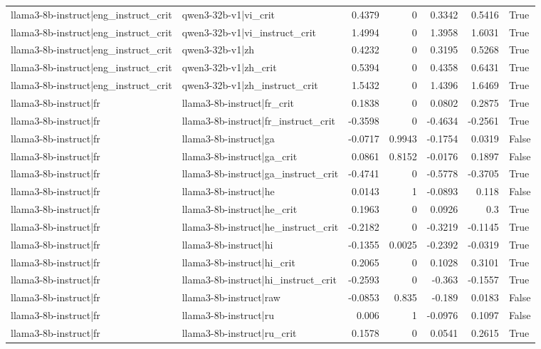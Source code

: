 \begin{table}
\begin{tabular}{l l r r r r l}
llama3-8b-instruct|eng_instruct_crit & qwen3-32b-v1|vi_crit & 0.4379 & 0 & 0.3342 & 0.5416 & True \\
llama3-8b-instruct|eng_instruct_crit & qwen3-32b-v1|vi_instruct_crit & 1.4994 & 0 & 1.3958 & 1.6031 & True \\
llama3-8b-instruct|eng_instruct_crit & qwen3-32b-v1|zh & 0.4232 & 0 & 0.3195 & 0.5268 & True \\
llama3-8b-instruct|eng_instruct_crit & qwen3-32b-v1|zh_crit & 0.5394 & 0 & 0.4358 & 0.6431 & True \\
llama3-8b-instruct|eng_instruct_crit & qwen3-32b-v1|zh_instruct_crit & 1.5432 & 0 & 1.4396 & 1.6469 & True \\
llama3-8b-instruct|fr & llama3-8b-instruct|fr_crit & 0.1838 & 0 & 0.0802 & 0.2875 & True \\
llama3-8b-instruct|fr & llama3-8b-instruct|fr_instruct_crit & -0.3598 & 0 & -0.4634 & -0.2561 & True \\
llama3-8b-instruct|fr & llama3-8b-instruct|ga & -0.0717 & 0.9943 & -0.1754 & 0.0319 & False \\
llama3-8b-instruct|fr & llama3-8b-instruct|ga_crit & 0.0861 & 0.8152 & -0.0176 & 0.1897 & False \\
llama3-8b-instruct|fr & llama3-8b-instruct|ga_instruct_crit & -0.4741 & 0 & -0.5778 & -0.3705 & True \\
llama3-8b-instruct|fr & llama3-8b-instruct|he & 0.0143 & 1 & -0.0893 & 0.118 & False \\
llama3-8b-instruct|fr & llama3-8b-instruct|he_crit & 0.1963 & 0 & 0.0926 & 0.3 & True \\
llama3-8b-instruct|fr & llama3-8b-instruct|he_instruct_crit & -0.2182 & 0 & -0.3219 & -0.1145 & True \\
llama3-8b-instruct|fr & llama3-8b-instruct|hi & -0.1355 & 0.0025 & -0.2392 & -0.0319 & True \\
llama3-8b-instruct|fr & llama3-8b-instruct|hi_crit & 0.2065 & 0 & 0.1028 & 0.3101 & True \\
llama3-8b-instruct|fr & llama3-8b-instruct|hi_instruct_crit & -0.2593 & 0 & -0.363 & -0.1557 & True \\
llama3-8b-instruct|fr & llama3-8b-instruct|raw & -0.0853 & 0.835 & -0.189 & 0.0183 & False \\
llama3-8b-instruct|fr & llama3-8b-instruct|ru & 0.006 & 1 & -0.0976 & 0.1097 & False \\
llama3-8b-instruct|fr & llama3-8b-instruct|ru_crit & 0.1578 & 0 & 0.0541 & 0.2615 & True \\

\end{tabular}
\end{table}
